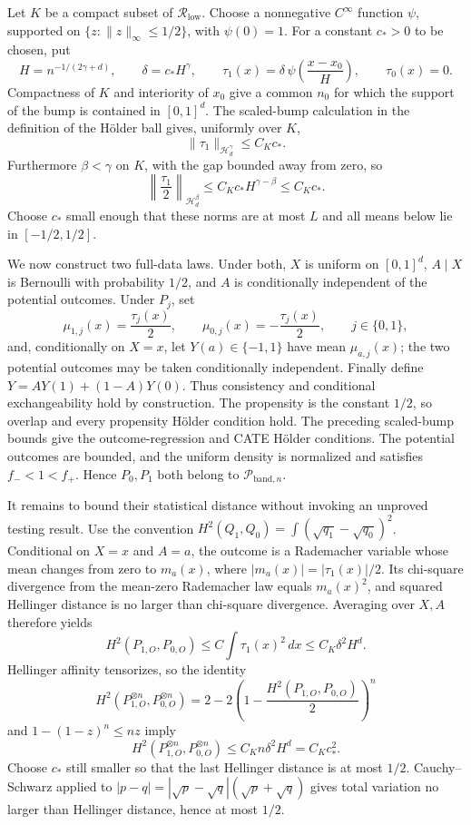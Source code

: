 Let \(K\) be a compact subset of \(\mathcal R_{\mathrm{low}}\).  Choose a
nonnegative \(C^\infty\) function \(\psi\), supported on
\(\{z:\lVert z\rVert_\infty\leq1/2\}\), with \(\psi(0)=1\).  For a constant
\(c_*>0\) to be chosen, put
\[
H=n^{-1/(2\gamma+d)},\qquad
\delta=c_*H^\gamma,\qquad
\tau_1(x)=\delta\,\psi\!\left(\frac{x-x_0}{H}\right),\qquad
\tau_0(x)=0.
\]
Compactness of \(K\) and interiority of \(x_0\) give a common \(n_0\) for
which the support of the bump is contained in \([0,1]^d\).  The scaled-bump
calculation in the definition of the H\"older ball gives, uniformly over
\(K\),
\[
\lVert\tau_1\rVert_{\mathcal H^\gamma_d}\leq C_Kc_*.
\]
Furthermore \(\beta<\gamma\) on \(K\), with the gap bounded away from zero,
so
\[
\left\lVert\frac{\tau_1}{2}\right\rVert_{\mathcal H^\beta_d}
\leq C_Kc_*H^{\gamma-\beta}\leq C_Kc_*.
\]
Choose \(c_*\) small enough that these norms are at most \(L\) and all means
below lie in \([-1/2,1/2]\).

We now construct two full-data laws.  Under both, \(X\) is uniform on
\([0,1]^d\), \(A\mid X\) is Bernoulli with probability \(1/2\), and \(A\) is
conditionally independent of the potential outcomes.  Under \(P_j\), set
\[
\mu_{1,j}(x)=\frac{\tau_j(x)}2,\qquad
\mu_{0,j}(x)=-\frac{\tau_j(x)}2,\qquad j\in\{0,1\},
\]
and, conditionally on \(X=x\), let \(Y(a)\in\{-1,1\}\) have mean
\(\mu_{a,j}(x)\); the two potential outcomes may be taken conditionally
independent.  Finally define \(Y=AY(1)+(1-A)Y(0)\).  Thus consistency and
conditional exchangeability hold by construction.  The propensity is the
constant \(1/2\), so overlap and every propensity H\"older condition hold.
The preceding scaled-bump bounds give the outcome-regression and CATE
H\"older conditions.  The potential outcomes are bounded, and the uniform
density is normalized and satisfies \(f_-<1<f_+\).  Hence \(P_0,P_1\) both
belong to \(\mathcal P_{\mathrm{band},n}\).

It remains to bound their statistical distance without invoking an
unproved testing result.  Use the convention
\(H^2(Q_1,Q_0)=\int(\sqrt{q_1}-\sqrt{q_0})^2\).  Conditional on \(X=x\) and
\(A=a\), the outcome is a Rademacher variable whose mean changes from zero
to \(m_a(x)\), where \(|m_a(x)|=|\tau_1(x)|/2\).  Its chi-square divergence
from the mean-zero Rademacher law equals \(m_a(x)^2\), and squared Hellinger
distance is no larger than chi-square divergence.  Averaging over \(X,A\)
therefore yields
\[
H^2(P_{1,O},P_{0,O})\leq C\int\tau_1(x)^2\,dx
\leq C_K\delta^2H^d.
\]
Hellinger affinity tensorizes, so the identity
\[
H^2(P_{1,O}^{\otimes n},P_{0,O}^{\otimes n})
=2-2\left(1-\frac{H^2(P_{1,O},P_{0,O})}{2}\right)^n
\]
and \(1-(1-z)^n\leq nz\) imply
\[
H^2(P_{1,O}^{\otimes n},P_{0,O}^{\otimes n})
\leq C_Kn\delta^2H^d=C_Kc_*^2.
\]
Choose \(c_*\) still smaller so that the last Hellinger distance is at most
\(1/2\).  Cauchy--Schwarz applied to
\(|p-q|=|\sqrt p-\sqrt q|(\sqrt p+\sqrt q)\) gives total variation no larger
than Hellinger distance, hence at most \(1/2\).

